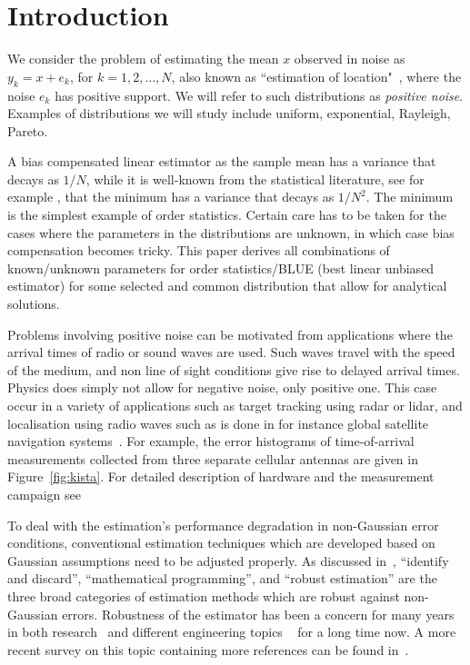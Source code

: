 \documentclass{article}
\begin{document}
\section{Introduction}\label{sec:introduction}
We consider the problem of estimating the mean $x$ observed in noise as $y_k=x+e_k$, for $k=1,2,\dots, N$,  also known as ``estimation of location"~\citep{article:PI_kassam_85}, where the noise $e_k$ has positive support. We will refer to such distributions as {\em positive noise}. Examples of distributions we will study include uniform, exponential, Rayleigh, Pareto.

A bias compensated linear estimator as the sample mean has a variance that decays as $1/N$, while it is well-known from the statistical literature, see for example \citep{book:ET_kay_93,book:TPE_lehmann}, that the minimum has a variance that decays as $1/N^2$. The minimum is the simplest example of order statistics. Certain care has to be taken for the cases where the parameters in the distributions are unknown, in which case bias compensation becomes tricky. This paper derives all combinations of known/unknown parameters for order statistics/BLUE (best linear unbiased estimator) for some selected and common distribution that allow for analytical solutions. 

Problems involving positive noise can be motivated from applications where the arrival times of radio or sound waves are used. Such waves travel with the speed of the medium, and non line of sight conditions give rise to delayed arrival times. Physics does simply not allow for negative noise, only positive one. This case occur in a variety of applications such as target tracking using radar or lidar, and localisation using radio waves such as is done in for instance global satellite navigation systems~\citep{article:ITVT_kok_15,article:ITVT_chen_09,article:ISPM_gustafsson_05,article:IME_eling_12}. For example, the error histograms of time-of-arrival measurements collected from three separate cellular antennas are given in Figure~\ref{fig:kista}. For detailed description of hardware and the measurement campaign see~\citep{conf:PIMRC_medbo_09}


To deal with the estimation's performance degradation in non-Gaussian error conditions, conventional estimation techniques which are developed based on Gaussian assumptions need to be adjusted properly. As discussed in~\citep{article:ITSP_yin_13}, ``identify and discard'', ``mathematical programming'', and ``robust estimation'' are the three broad categories of estimation methods which are robust against non-Gaussian errors. Robustness of the estimator has been a concern for many years in both research~\citep{article:JASA_stigler_73} and different engineering topics ~\citep{article:PI_kassam_85,book:SDNGN_kassam,article:SIAM_stewart_99,book:NSP_arce} for a long time now. A more recent survey on this topic containing more references can be found in~\citep{article:ISPM_zoubir_12}.
\end{document}
